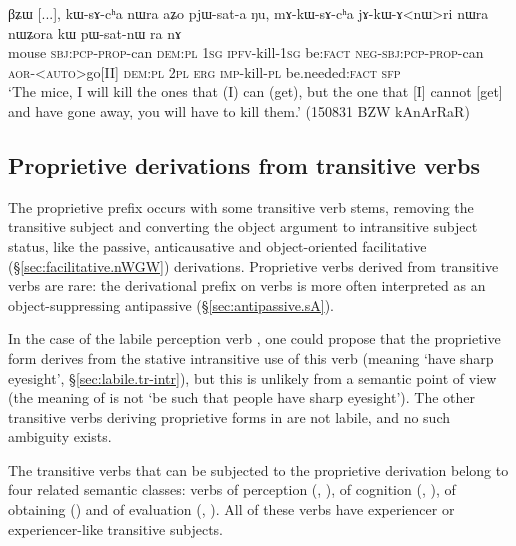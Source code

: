 \begin{exe}
\ex \label{ex:kWsAcha.mAkWsAcha}
\gll βʑɯ [...], kɯ-sɤ-cʰa nɯra aʑo pjɯ-sat-a ŋu, mɤ-kɯ-sɤ-cʰa jɤ-kɯ-ɤ<nɯ>ri nɯra nɯʑora kɯ pɯ-sat-nɯ ra nɤ \\
mouse {   } \textsc{sbj}:\textsc{pcp}-\textsc{prop}-can \textsc{dem}:\textsc{pl} \textsc{1sg} \textsc{ipfv}-kill-\textsc{1sg} be:\textsc{fact} \textsc{neg}-\textsc{sbj}:\textsc{pcp}-\textsc{prop}-can \textsc{aor}-<\textsc{auto}>go[II] \textsc{dem}:\textsc{pl} \textsc{2pl} \textsc{erg} \textsc{imp}-kill-\textsc{pl} be.needed:\textsc{fact} \textsc{sfp} \\
\glt `The mice, I will kill the ones that (I) can (get), but the one that [I] cannot [get] and have gone away, you will have to kill them.' (150831 BZW kAnArRaR)
\end{exe}

\subsection{Proprietive derivations from transitive verbs} \label{sec:proprietive.tr}
The proprietive prefix occurs with some transitive verb stems, removing the transitive subject and converting the object  argument to intransitive subject status, like the passive, anticausative and object-oriented facilitative (§\ref{sec:facilitative.nWGW}) derivations. Proprietive verbs derived from transitive verbs are rare: the derivational  prefix on verbs is more often interpreted as an object-suppressing antipassive (§\ref{sec:antipassive.sA}).

In the case of the labile perception verb , one could propose that the proprietive form  derives from the stative intransitive use of this verb (meaning `have sharp eyesight', §\ref{sec:labile.tr-intr}), but this is unlikely from a semantic point of view (the meaning of  is not `be such that people have sharp eyesight'). The other transitive verbs deriving proprietive forms in  are not labile, and no such ambiguity exists.

The transitive verbs that can be subjected to the proprietive derivation belong to four related semantic classes: verbs of perception (, ), of cognition (, ), of obtaining () and of evaluation (, ). All of these verbs have experiencer or experiencer-like transitive subjects.

